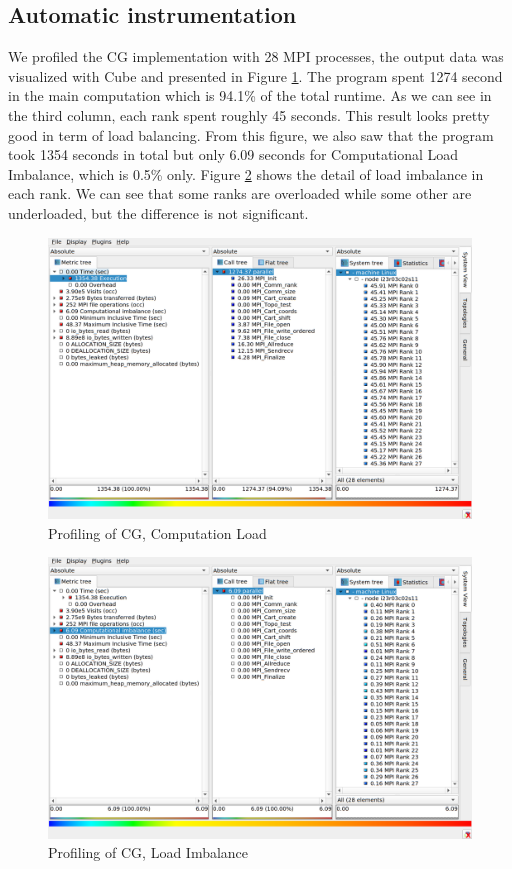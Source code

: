 \documentclass[article]{scrartcl}
\begin{document}
\subsection{Automatic instrumentation}
We profiled the CG implementation with 28 MPI processes, the output data was visualized with Cube and presented in Figure \ref{fig:sca_compload}. The program spent 1274 second in the main computation which is 94.1\% of the total runtime. As we can see in the third column, each rank spent roughly 45 seconds. This result looks pretty good in term of load balancing. From this figure, we also saw that the program took 1354 seconds in total but only 6.09 seconds for Computational Load Imbalance, which is 0.5\% only. Figure \ref{fig:sca_loadim} shows the detail of load imbalance in each rank. We can see that some ranks are overloaded while some other are underloaded, but the difference is not significant. 
\begin{figure}[htpb]
    \centering
    \includegraphics[width=.9\textwidth,keepaspectratio=true]{../figs/3_1_Cube_Computation.png}
    \caption{Profiling of CG, Computation Load}
    \label{fig:sca_compload}
\end{figure}
\begin{figure}[htpb]
    \centering
    \includegraphics[width=.9\textwidth,keepaspectratio=true]{../figs/3_1_Cube_LoadImbalance.png}
    \caption{Profiling of CG, Load Imbalance}
    \label{fig:sca_loadim}
\end{figure}
\end{document}

